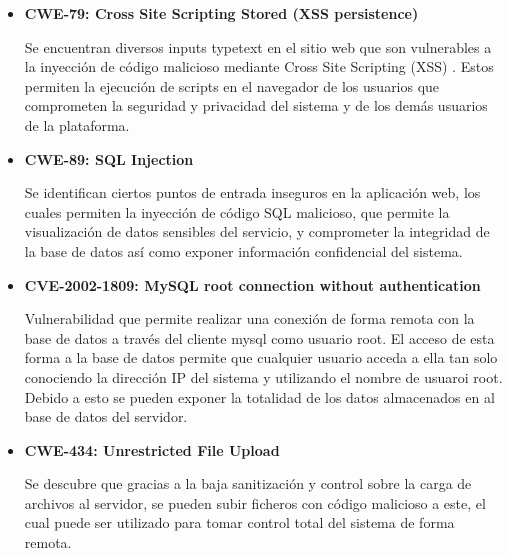 \documentclass[12pt,oneside,a4paper]{book}
\begin{document}
\begin{itemize}
\item \textbf{CWE-79: Cross Site Scripting Stored (XSS persistence)}
	
\vspace{1em}

\hspace{20pt}
Se encuentran diversos inputs typetext en el sitio web que son vulnerables a la inyección de código malicioso mediante Cross Site Scripting (XSS) . Estos permiten la ejecución de scripts en el navegador de los usuarios que comprometen la seguridad y privacidad del sistema y de los demás usuarios de la plataforma.
\vspace{2em}

\item \textbf{CWE-89: SQL Injection}

\vspace{1em}

\hspace{20pt}
Se identifican ciertos puntos de entrada inseguros en la aplicación web, los cuales permiten la inyección de código SQL malicioso, que permite la visualización de datos sensibles del servicio, y comprometer la integridad de la base de datos así como exponer información confidencial del sistema.

\vspace{2em}

\item \textbf{CVE-2002-1809: MySQL root connection without authentication}

\vspace{1em}

\hspace{20pt}
Vulnerabilidad que permite realizar una conexión de forma remota con la base de datos a través del cliente mysql como usuario root. El acceso de esta forma a la base de datos permite que cualquier usuario acceda a ella tan solo conociendo la dirección IP del sistema y utilizando el nombre de usuaroi root. Debido a esto se pueden exponer la totalidad de los datos almacenados en al base de datos del servidor.

\vspace{2em}

\item \textbf{CWE-434: Unrestricted File Upload}

\vspace{1em}

\hspace{20pt}
Se descubre que gracias a la baja sanitización y control sobre la carga de archivos al servidor, se pueden subir ficheros con código malicioso a este, el cual puede ser utilizado para tomar control total del sistema de forma remota.


\end{itemize}
\end{document}
